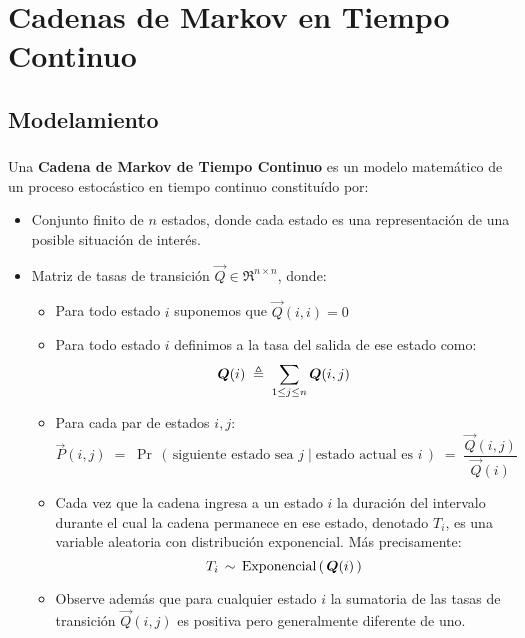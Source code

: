 \documentclass[ 10pt, xcolor = dvipsnames]{beamer}
\begin{document}
\section{Cadenas de Markov en Tiempo Continuo}

\subsection{Modelamiento}

\begin{frame}[allowframebreaks]
\frametitle{\insertsubsection}

Una \textbf{Cadena de Markov de Tiempo Continuo} es un modelo matem\'atico de un proceso estoc\'astico en tiempo continuo constitu\'ido por: 
\begin{itemize}
\item Conjunto finito de $n$ estados, donde cada estado es una representaci\'on de una posible situaci\'on de inter\'es. 
\item Matriz de tasas de transici\'on $\vec{Q} \in \Re^{n \times n}$, donde: 
\begin{itemize}
\item Para todo estado $i$ suponemos que $\vec{Q}(i,i) = 0$
\item Para todo estado $i$ definimos a la tasa del salida de ese estado como: 
\[
{\boldsymbol{Q}}(i) \; \triangleq \; \sum_{ 1 \leq j \leq n } {\boldsymbol{Q}}(i,j)
\]
\fullcut
\item Para cada par de estados $i,j$: 
\[
\vec{P}(i,j) \; = \; 
\Pr \, ( \, \text{siguiente estado sea } j \mid \text{estado actual es } i \, ) \; = \; 
\frac{ \vec{Q}(i,j) }{ \; \vec{Q}(i) \; }
\]
\framebreak
\item Cada vez que la cadena ingresa a un estado $i$ la duraci\'on del intervalo \linebreak durante el cual la cadena permanece en ese estado, denotado $T_i$, es una variable aleatoria con distribuci\'on exponencial. M\'as precisamente: 
\[
T_i \, \sim \, \text{Exponencial} \, ( \, {\boldsymbol{Q}}(i) \, )
\]

\item Observe adem\'as que para cualquier estado $i$ la sumatoria de las tasas de transici\'on $\vec{Q}(i,j)$ es positiva pero generalmente diferente de uno. 
\end{itemize}
\end{itemize}

\end{frame}
\end{document}
